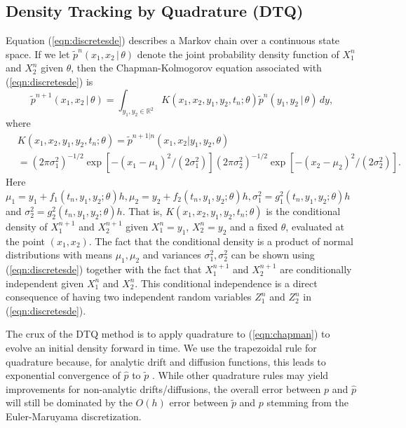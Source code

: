 \documentclass[graybox]{svmult}
\begin{document}
\subsection{Density Tracking by Quadrature (DTQ)}
\label{subsec:2-1}
Equation (\ref{eqn:discretesde}) describes a Markov chain over a continuous state space.  If we let $\widetilde{p}^n(x_1,x_2 \, | \, \theta)$ denote the joint probability density function of $X_1^n$ and $X_2^n$ given $\theta$, then the Chapman-Kolmogorov equation associated with (\ref{eqn:discretesde})  is
\begin{equation}
\label{eqn:chapman}
\widetilde{p}^{n+1}(x_1,x_2 \, | \, \theta) = \int_{y_1,y_2 \in \mathbb{R}^2} K(x_1,x_2,y_1,y_2,t_n; \theta) \widetilde{p}^n(y_1,y_2 \, | \, \theta) \, dy,
\end{equation}
where
\begin{align}
&K(x_1,x_2,y_1,y_2,t_n; \theta) = \widetilde{p}^{{n+1} | {n}}(x_1,x_2 | y_1,y_2,\theta) \nonumber\\
&= (2 \pi \sigma_1^2)^{-1/2} \exp \left[ -(x_1 - \mu_1)^2/(2 \sigma_1^2) \right] (2 \pi \sigma_2^2)^{-1/2} \exp \left[ -(x_2 - \mu_2)^2/(2 \sigma_2^2) \right]\nonumber.
\end{align}
Here $\mu_1 = y_1 + f_1(t_n,y_1,y_2; \theta) h,  \mu_2 = y_2 + f_2(t_n,y_1,y_2; \theta) h,  \sigma_1^2 = g_1^2(t_n,y_1,y_2; \theta) h$ and  $\sigma_2^2 = g_2^2(t_n,y_1,y_2; \theta) h$. That is, $K(x_1,x_2,y_1,y_2,t_n; \theta)$ is the conditional density of $X_1^{n+1}$ and $X_2^{n+1}$ given $X_1^n = y_1$, $X_2^n = y_2$ and a fixed $\theta$, evaluated at the point $(x_1,x_2)$.  The fact that the conditional density is a product of normal distributions with means $\mu_1, \mu_2$ and variances $\sigma_1^2, \sigma_2^2$ can be shown using (\ref{eqn:discretesde}) together with the fact that $X_1^{n+1}$ and $X_2^{n+1}$ are conditionally independent given $X_1^n$ and $X_2^n$. This conditional independence is a direct consequence of having two independent random variables $Z_1^n$ and $Z_2^n$ in (\ref{eqn:discretesde}).

The crux of the DTQ method is to apply quadrature to (\ref{eqn:chapman}) to evolve an initial density forward in time. We use the trapezoidal rule for quadrature because, for analytic drift and diffusion functions, this leads to exponential convergence of $\hat{p}$ to $\tilde{p}$ \cite{BhatMadu2016}.  While other quadrature rules may yield improvements for non-analytic drifts/diffusions, the overall error between $p$ and $\hat{p}$ will still be dominated by the $O(h)$ error between $\tilde{p}$ and $p$ stemming from the Euler-Maruyama discretization.
\end{document}
